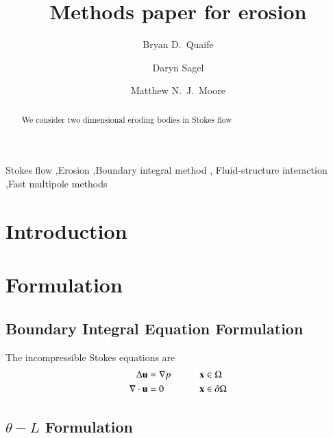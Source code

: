 \documentclass[preprint, 10pt]{elsarticle}
\begin{document}
\title{Methods paper for erosion}

\author[fsu1]{Bryan D.~Quaife} 
\author[fsu3]{Daryn Sagel} 
\author[fsu2]{Matthew N.~J.~Moore}
\address[fsu1]{Department of Scientific Computing, Florida State
University, Tallahassee, FL, 32306.}
\address[fsu2]{Department of Mathematics, Florida State University,
Tallahassee, FL, 32306.}

\begin{abstract} 
We consider two dimensional eroding bodies in Stokes flow
\end{abstract}

\begin{keyword}
  Stokes flow \sep Erosion \sep Boundary integral method \sep
  Fluid-structure interaction \sep Fast multipole methods 
\end{keyword}

\maketitle

\section{Introduction\label{s:intro}}
\cite{moo-ris-chi-zha-she2013}



\section{Formulation\label{s:formulation}} 

\subsection{Boundary Integral Equation Formulation} 
The incompressible Stokes equations are
\begin{alignat*}{3}
  \Delta {\mathbf{u}} &= {\nabla} p  \qquad && {\mathbf{x}} \in \Omega \\
  {\nabla} \cdot {\mathbf{u}} &= 0   && {\mathbf{x}} \in {\partial}\Omega
\end{alignat*}


\subsection{$\theta-L$ Formulation} 
\end{document}
